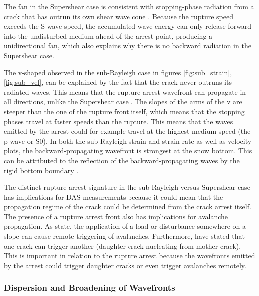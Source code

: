 The fan in the Supershear case is consistent with stopping-phase radiation from a crack that has outrun its own shear wave cone \parencite{madariagaHighfrequencyRadiationCrack1977}. Because the rupture speed exceeds the S-wave speed, the accumulated wave energy can only release forward into the undisturbed medium ahead of the arrest point, producing a unidirectional fan, which also explains why there is no backward radiation in the Supershear case. \par

The v-shaped observed in the sub-Rayleigh case in figures \ref{fig:sub_strain}, \ref{fig:sub_vel}, can be explained by the fact that the crack never outruns its radiated waves. This means that the rupture arrest wavefront can propagate in all directions, unlike the Supershear case \parencite{freundDynamicFractureMechanics1998}. The slopes of the arms of the v are steeper than the one of the rupture front itself, which means that the stopping phases travel at faster speeds than the rupture. This means that the waves emitted by the arrest could for example travel at the highest medium speed (the p-wave or S0). In both the sub-Rayleigh strain and strain rate as well as velocity plots, the backward-propagating wavefront is strongest at the snow bottom. This can be attributed to the reflection of the backward-propagating waves by the rigid bottom boundary \parencite{graffWaveMotionElastic1975}. \par 

The distinct rupture arrest signature in the sub-Rayleigh versus Supershear case has implications for DAS measurements because it could mean that the propagation regime of the crack could be determined from the crack arrest itself. The presence of a rupture arrest front also has implications for avalanche propagation. As \cite{gaumeInvestigatingReleaseFlow2019,gaumeDynamicAnticrackPropagation2018} state, the application of a load or disturbance somewhere on a slope can cause remote triggering of avalanches. Furthermore, \cite{burridgeAdmissibleSpeedsPlaneStrain1973,trottetTransitionSubRayleighAnticrack2022} have stated that one crack can trigger another (daughter crack nucleating from mother crack). This is important in relation to the rupture arrest because the wavefronts emitted by the arrest could trigger daughter cracks or even trigger avalanches remotely. \par

\subsubsection{Dispersion and Broadening of Wavefronts}

